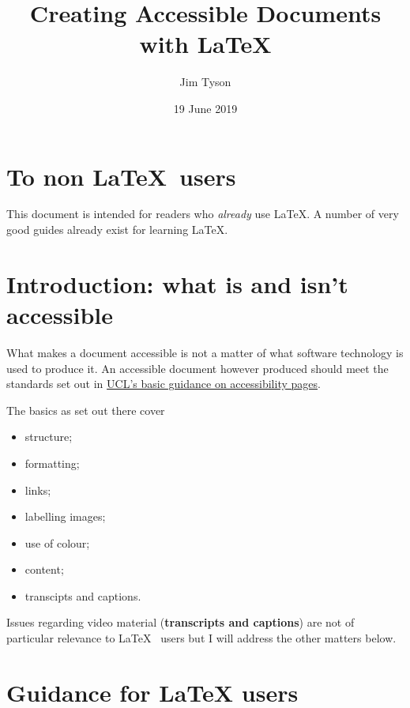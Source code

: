 \documentclass[]{article}
\title{Creating Accessible Documents with LaTeX}
\author{Jim Tyson}
\date{19 June 2019}
\providecommand{\tightlist}{%
  \setlength{\itemsep}{0pt}\setlength{\parskip}{0pt}}
\begin{document}
\onehalfspacing

\maketitle

{
\setcounter{tocdepth}{2}
\tableofcontents
}
\hypertarget{to-non-users}{%
\section{\texorpdfstring{To non
\LaTeX~users}{To non ~users}}\label{to-non-users}}

This document is intended for readers who \emph{already} use \LaTeX. A
number of very good guides already exist for learning \LaTeX.

\hypertarget{introduction-what-is-and-isnt-accessible}{%
\section{Introduction: what is and isn't
accessible}\label{introduction-what-is-and-isnt-accessible}}

What makes a document accessible is not a matter of what software
technology is used to produce it. An accessible document however
produced should meet the standards set out in
\href{https://www.ucl.ac.uk/isd/services/websites-apps/creating-accessible-content/accessibility-fundamentals}{UCL's
basic guidance on accessibility pages}.

The basics as set out there cover

\begin{itemize}
\tightlist
\item
  structure;
\item
  formatting;
\item
  links;
\item
  labelling images;
\item
  use of colour;
\item
  content;%
\item
  transcipts and captions.
\end{itemize}

Issues regarding video material (\textbf{transcripts and captions}) are
not of particular relevance to \LaTeX~ users but I will address the
other matters below.

\hypertarget{guidance-for-latex-users}{%
\section{Guidance for LaTeX users}\label{guidance-for-latex-users}}
\end{document}
